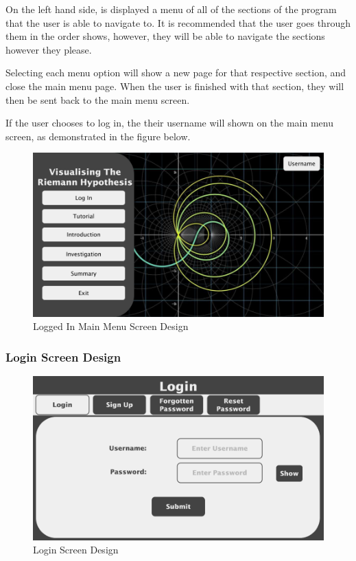 \documentclass{article}
\begin{document}
On the left hand side, is displayed a menu of all of the sections of the program that the user is able to navigate to. It is recommended that the user goes through them in the order shows, however, they will be able to navigate the sections however they please.

Selecting each menu option will show a new page for that respective section, and close the main menu page. When the user is finished with that section, they will then be sent back to the main menu screen.

If the user chooses to log in, the their username will shown on the main menu screen, as demonstrated in the figure below.

\begin{figure}[h]
    \centering
    \includegraphics[scale=0.2]{main-menu-logged-in-screen-design}
    \caption{Logged In Main Menu Screen Design}
\end{figure}

\clearpage

\subsubsection{Login Screen Design}

\begin{figure}[ht]
    \centering
    \includegraphics[scale=0.3]{login-screen-design}
    \caption{Login Screen Design}
\end{figure}
\end{document}
